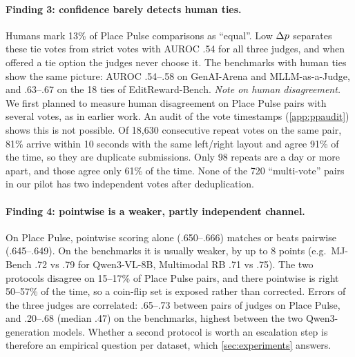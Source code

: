 \paragraph{Finding 3: confidence barely detects human ties.}
Humans mark 13\% of Place Pulse comparisons as ``equal''. Low $\Delta p$ separates these tie votes from strict votes with AUROC .54 for all three judges, and when offered a tie option the judges never choose it.
The benchmarks with human ties show the same picture: AUROC .54--.58 on GenAI-Arena and MLLM-as-a-Judge, and .63--.67 on the 18 ties of EditReward-Bench.
\emph{Note on human disagreement.} We first planned to measure human disagreement on Place Pulse pairs with several votes, as in earlier work. An audit of the vote timestamps (\cref{app:ppaudit}) shows this is not possible. Of 18{,}630 consecutive repeat votes on the same pair, 81\% arrive within 10 seconds with the same left/right layout and agree 91\% of the time, so they are duplicate submissions. Only 98 repeats are a day or more apart, and those agree only 61\% of the time. None of the 720 ``multi-vote'' pairs in our pilot has two independent votes after deduplication.

\paragraph{Finding 4: pointwise is a weaker, partly independent channel.}
On Place Pulse, pointwise scoring alone (.650--.666) matches or beats pairwise (.645--.649). On the benchmarks it is usually weaker, by up to 8 points (e.g.\ MJ-Bench .72 vs .79 for Qwen3-VL-8B, Multimodal RB .71 vs .75).
The two protocols disagree on 15--17\% of Place Pulse pairs, and there pointwise is right 50--57\% of the time, so a coin-flip set is exposed rather than corrected. Errors of the three judges are correlated: .65--.73 between pairs of judges on Place Pulse, and .20--.68 (median .47) on the benchmarks, highest between the two Qwen3-generation models.
Whether a second protocol is worth an escalation step is therefore an empirical question per dataset, which \cref{sec:experiments} answers.
